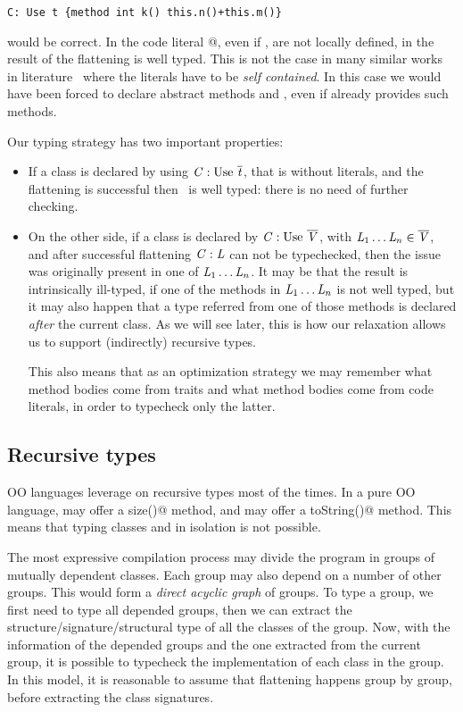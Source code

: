 \saveSpace\begin{lstlisting}
C: Use t {method int k() this.n()+this.m()}
\end{lstlisting}\saveSpace
\noindent would be correct. In the code literal
@, 
 even if \Q@n@, \Q@m@ are not locally defined, in 
\name the result of the flattening is well typed.
This is not the case in many similar works in literature~\cite{deep,Bettini2015282,Bergel2007} where the
literals have to be \emph{self contained}. In this case we would have been forced to
declare abstract methods \Q@n@ and \Q@m@, even if \Q@t@ already 
provides such methods.

Our typing strategy has two important properties:
\begin{itemize}
\item If a class is declared by using $\mC : \use\ \overline\mt$, that is without literals,
and the flattening is successful then \mC\ is well typed: there is no need of further checking.
\item On the other side, if a class is declared by $\mC : \use\ \overline\mV$, with
$\mathit{L}_1\ldots\mathit{L}_n \in \overline{\mathit{V}}$, and after successful flattening $\mathit{C} : \mathit{L}$ can not be typechecked,
then the issue was originally present in one of $\mathit{L}_1\ldots\mathit{L}_n$.
It may be that the result is intrinsically ill-typed, if one of the methods in $\mathit{L}_1\ldots\mathit{L}_n$ is not well typed,
but it may also happen that a type referred from one of those methods
is declared \emph{after} the current class. As we will see later, this
is how our relaxation allows us to support (indirectly) recursive types.

This also means that as an optimization strategy
 we may remember what method bodies come from traits and what method bodies come from code literals, in order to typecheck only the latter.
 \end{itemize}

 \subsection{Recursive types}

OO languages leverage on recursive types most of the times.
In a pure OO language, \Q@String@ may offer a \Q@Int size()@
method, and \Q@Int@ may offer a \Q@String toString()@ method.
This means that typing classes 
\Q@String@ and \Q@Int@ in isolation is not possible.

The most expressive compilation process may divide the program in groups of mutually 
dependent classes.
Each group may also depend on a number of other groups.
This would form a \emph{direct acyclic graph} of groups.
To type a group, we first need to type all depended groups, then
we can extract the structure/signature/structural type of all
the classes of the group.
Now, with the information of the depended groups and the one extracted
from the current group, it is possible to typecheck the implementation
 of each class in the group.
In this model, it is reasonable to assume that flattening happens group by group, before
extracting the class signatures.

